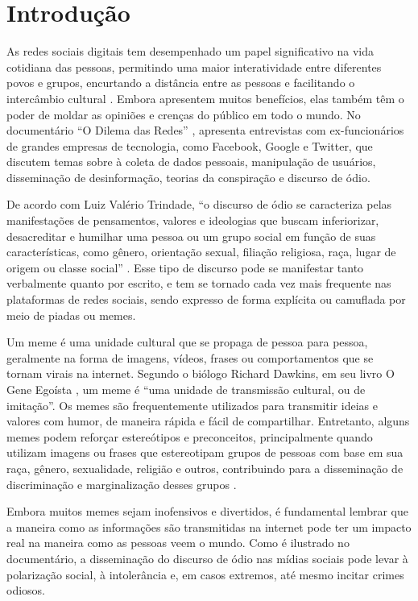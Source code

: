 \chapter{Introdução}
\label{cap:01}

As redes sociais digitais tem desempenhado um papel significativo na vida cotidiana das pessoas, permitindo uma maior interatividade entre diferentes povos e grupos, encurtando a distância entre as pessoas e facilitando o intercâmbio cultural \cite{Nascimento2017}. Embora apresentem muitos benefícios, elas também têm o poder de moldar as opiniões e crenças do público em todo o mundo. No documentário “O Dilema das Redes” \cite{SocialDilemma2020}, apresenta entrevistas com ex-funcionários de grandes empresas de tecnologia, como Facebook, Google e Twitter, que discutem temas sobre à coleta de dados pessoais, manipulação de usuários, disseminação de desinformação, teorias da conspiração e discurso de ódio.

De acordo com Luiz Valério Trindade, ``o discurso de ódio se caracteriza pelas manifestações de pensamentos, valores e ideologias que buscam inferiorizar, desacreditar e humilhar uma pessoa ou um grupo social em função de suas características, como gênero, orientação sexual, filiação religiosa, raça, lugar de origem ou classe social'' \cite{Trindade2022}. Esse tipo de discurso pode se manifestar tanto verbalmente quanto por escrito, e tem se tornado cada vez mais frequente nas plataformas de redes sociais, sendo expresso de forma explícita ou camuflada por meio de piadas ou memes.

Um meme é uma unidade cultural que se propaga de pessoa para pessoa, geralmente na forma de imagens, vídeos, frases ou comportamentos que se tornam virais na internet. Segundo o biólogo Richard Dawkins, em seu livro O Gene Egoísta \cite{Dawkins1976}, um meme é ``uma unidade de transmissão cultural, ou de imitação''. Os memes são frequentemente utilizados para transmitir ideias e valores com humor, de maneira rápida e fácil de compartilhar. Entretanto, alguns memes podem reforçar estereótipos e preconceitos, principalmente quando utilizam imagens ou frases que estereotipam grupos de pessoas com base em sua raça, gênero, sexualidade, religião e outros, contribuindo para a disseminação de discriminação e marginalização desses grupos \cite{Burke2004}.

Embora muitos memes sejam inofensivos e divertidos, é fundamental lembrar que a maneira como as informações são transmitidas na internet pode ter um impacto real na maneira como as pessoas veem o mundo. Como é ilustrado no documentário, a disseminação do discurso de ódio nas mídias sociais pode levar à polarização social, à intolerância e, em casos extremos, até mesmo incitar crimes odiosos.

